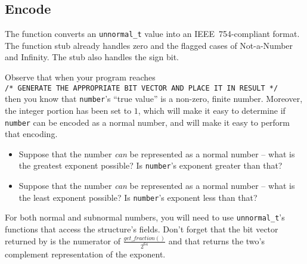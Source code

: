 \subsection*{Encode}

The  function converts an \lstinline{unnormal_t} value into an IEEE~754-compliant format.
The function stub already handles zero and the flagged cases of Not-a-Number and Infinity.
The stub also handles the sign bit.

Observe that when your program reaches \\
\lstinline{/* GENERATE THE APPROPRIATE BIT VECTOR AND PLACE IT IN RESULT */} \\
then you know that \lstinline{number}'s ``true value'' is a non-zero, finite number.
Moreover, the integer portion has been set to $1$, which will make it easy to determine if \lstinline{number} can be encoded as a normal number,
and will make it easy to perform that encoding.

\begin{description}
    \begin{itemize}
        \item Suppose that the number \textit{can} be represented as a normal number -- what is the greatest exponent possible?
        Is \lstinline{number}'s exponent greater than that?
    \end{itemize}
    \begin{itemize}
        \item Suppose that the number \textit{can} be represented as a normal number -- what is the least exponent possible?
            Is \lstinline{number}'s exponent less than that?
    \end{itemize}
\end{description}
For both normal and subnormal numbers, you will need to use \lstinline{unnormal_t}'s functions that access the structure's fields.
Don't forget that the bit vector returned by  is the numerator of $\frac{get\_fraction()}{2^{64}}$ and that  returns the two's complement representation of the exponent.

